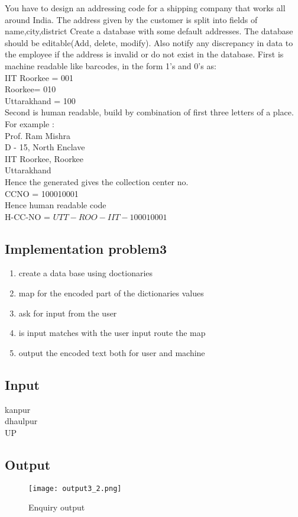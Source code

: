 \documentclass[12pt]{article}
\begin{document}
{{{You have to design an addressing code for a shipping company that works all around India. The address given by the customer is split into fields of name,city,district
Create a database with some default addresses.
The database should be editable(Add, delete, modify).
Also notify any discrepancy in data to the employee if the address is invalid or do not exist in the database.
First is machine readable like barcodes, in the form 1’s and 0’s as:\\
IIT Roorkee  = 001\\
Roorkee= 010\\
Uttarakhand = 100\\
Second is human readable, build by combination of first three letters of a place.\\
For example :\\
Prof. Ram Mishra\\
D - 15, North Enclave\\
IIT Roorkee, Roorkee\\
Uttarakhand\\
Hence the generated gives the collection center no. \\CCNO = 100010001\\
Hence human readable code\\ H-CC-NO = $ UTT-ROO-IIT-100010001$
\subsection{Implementation problem3}
\begin{enumerate}
\item{create a data base using doctionaries}
\item{map for the encoded part of the dictionaries values}
\item{ask for input from the user}
\item{is input matches with the user input route the map}
\item{output the encoded text both for user and machine}

\end{enumerate}
{

\subsection{Input}   %
kanpur\\
dhaulpur\\
UP\\

\subsection{Output}
\begin{figure}[H]
{
 \centering
\texttt{[image: output3\_2.png]}
\caption{Enquiry output}
\vspace{2cm}

}
\end{figure}}}}}
\end{document}
